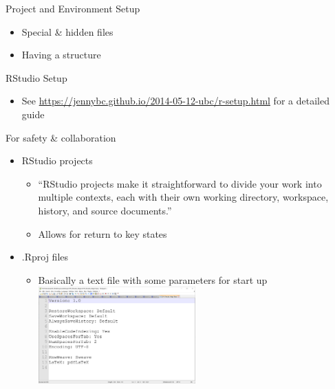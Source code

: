 \documentclass[ignorenonframetext,]{beamer}
\providecommand{\tightlist}{%
  \setlength{\itemsep}{0pt}\setlength{\parskip}{0pt}}
\begin{document}
\begin{frame}{Project and Environment Setup}
\protect\hypertarget{project-and-environment-setup}{}

\begin{itemize}
\tightlist
\item
  Special \& hidden files
\item
  Having a structure
\end{itemize}

\end{frame}

\begin{frame}{RStudio Setup}
\protect\hypertarget{rstudio-setup-1}{}

\begin{itemize}
\tightlist
\item
  See \url{https://jennybc.github.io/2014-05-12-ubc/r-setup.html} for a
  detailed guide
\end{itemize}

\end{frame}

\begin{frame}{For safety \& collaboration}
\protect\hypertarget{for-safety-collaboration}{}

\begin{itemize}
\tightlist
\item
  RStudio projects

  \begin{itemize}
  \tightlist
  \item
    ``RStudio projects make it straightforward to divide your work into
    multiple contexts, each with their own working directory, workspace,
    history, and source documents.''
  \item
    Allows for return to key states
  \end{itemize}
\item
  .Rproj files

  \begin{itemize}
  \tightlist
  \item
    Basically a text file with some parameters for start up
    \includegraphics[width=0.5\textwidth,height=\textheight]{../external/images/Rproj_inside.PNG}
  \end{itemize}
\end{itemize}

\end{frame}
\end{document}
